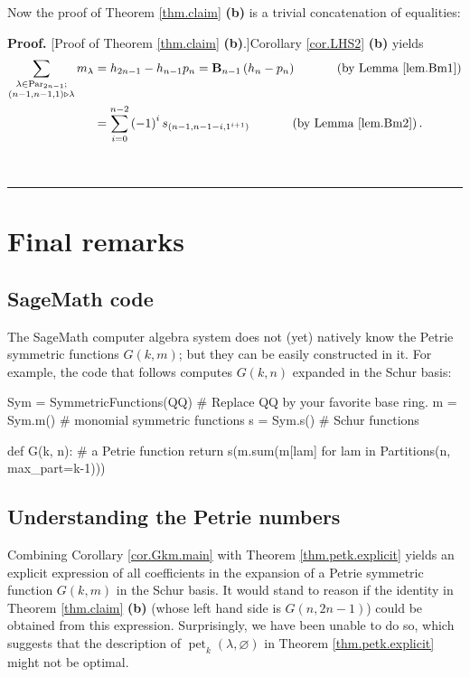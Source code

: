 \documentclass[numbers=enddot,12pt,final,onecolumn,notitlepage]{scrartcl}%
\theoremstyle{definition}
\newenvironment{proof}[1][Proof]{\noindent\textbf{#1.} }{\ \rule{0.5em}{0.5em}}
\let\sumnonlimits\sum
\renewcommand{\sum}{\sumnonlimits\limits}
\begin{document}
Now the proof of Theorem \ref{thm.claim} \textbf{(b)} is a trivial
concatenation of equalities:

\begin{proof}
[Proof of Theorem \ref{thm.claim} \textbf{(b)}.]Corollary \ref{cor.LHS2}
\textbf{(b)} yields%
\begin{align*}
\sum_{\substack{\lambda\in\operatorname*{Par}\nolimits_{2n-1};\\\left(
n-1,n-1,1\right)  \triangleright\lambda}}m_{\lambda}  &  =h_{2n-1}%
-h_{n-1}p_{n}=\mathbf{B}_{n-1}\left(  h_{n}-p_{n}\right)
\ \ \ \ \ \ \ \ \ \ \left(  \text{by Lemma \ref{lem.Bm1}}\right) \\
&  =\sum_{i=0}^{n-2}\left(  -1\right)  ^{i}s_{\left(  n-1,n-1-i,1^{i+1}%
\right)  }\ \ \ \ \ \ \ \ \ \ \left(  \text{by Lemma \ref{lem.Bm2}}\right)  .
\end{align*}

\end{proof}

\section{\label{sect.fin}Final remarks}

\subsection{SageMath code}

The SageMath computer algebra system \cite{SageMath} does not (yet) natively
know the Petrie symmetric functions $G\left(  k,m\right)  $; but they can be
easily constructed in it. For example, the code that follows computes
$G\left(  k, n\right)  $ expanded in the Schur basis:

\begin{python}
Sym = SymmetricFunctions(QQ) # Replace QQ by your favorite base ring.
m = Sym.m() # monomial symmetric functions
s = Sym.s() # Schur functions
	
def G(k, n): # a Petrie function
	return s(m.sum(m[lam] for lam in Partitions(n, max_part=k-1)))
\end{python}


\subsection{Understanding the Petrie numbers}

Combining Corollary \ref{cor.Gkm.main} with Theorem \ref{thm.petk.explicit}
yields an explicit expression of all coefficients in the expansion of a Petrie
symmetric function $G\left(  k,m\right)  $ in the Schur basis. It would stand
to reason if the identity in Theorem \ref{thm.claim} \textbf{(b)} (whose left
hand side is $G\left(  n,2n-1\right)  $) could be obtained from this
expression. Surprisingly, we have been unable to do so, which suggests that
the description of $\operatorname*{pet}\nolimits_{k}\left(  \lambda
,\varnothing\right)  $ in Theorem \ref{thm.petk.explicit} might not be optimal.
\end{document}
